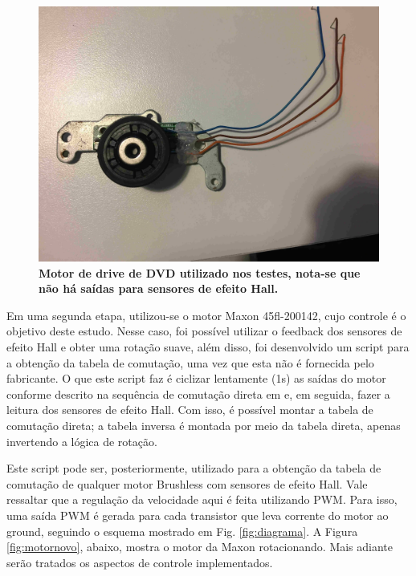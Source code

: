\documentclass[10pt,fleqn,a4paper]{article}
\begin{document}
	\begin{figure}[ht]
		\begin{center}
			\includegraphics[angle=0, scale=0.06]{images/motorantigo}
		\end{center}
		\caption{\textbf{Motor de drive de DVD utilizado nos testes, nota-se que não há saídas para sensores de efeito Hall.}}
		\label{fig:motorantigo}
	\end{figure}
    
    Em uma segunda etapa, utilizou-se o motor Maxon 45fl-200142, cujo controle é o objetivo deste estudo. Nesse caso, foi possível utilizar o feedback dos sensores de efeito Hall e obter uma rotação suave, além disso, foi desenvolvido um script para a obtenção da tabela de comutação, uma vez que esta não é fornecida pelo fabricante. O que este script faz é ciclizar lentamente (1s) as saídas do motor conforme descrito na sequência de comutação direta em \cite{atmeldiagrama} e, em seguida, fazer a leitura dos sensores de efeito Hall. Com isso, é possível montar a tabela de comutação direta; a tabela inversa é montada por meio da tabela direta, apenas invertendo a lógica de rotação.
    
    Este script pode ser, posteriormente, utilizado para a obtenção da tabela de comutação de qualquer motor Brushless com sensores de efeito Hall. Vale ressaltar que a regulação da velocidade aqui é feita utilizando PWM. Para isso, uma saída PWM é gerada para cada transistor que leva corrente do motor ao ground, seguindo o esquema mostrado em Fig. \ref{fig:diagrama}.
    A Figura \ref{fig:motornovo}, abaixo, mostra o motor da Maxon rotacionando. Mais adiante serão tratados os aspectos de controle implementados.
\end{document}
